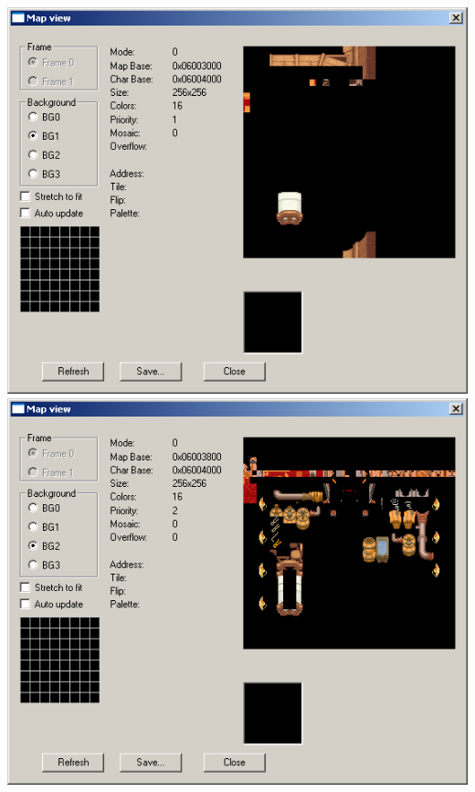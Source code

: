 \documentclass[
]{book}
\begin{document}
\includegraphics{images/39_home_fast6191_romhackingguide_unrenamed_file___original_borders_romhackingguideBGlayering3.png}\includegraphics{images/40_home_fast6191_romhackingguide_unrenamed_file___original_borders_romhackingguideBGlayering4.png}
\end{document}
